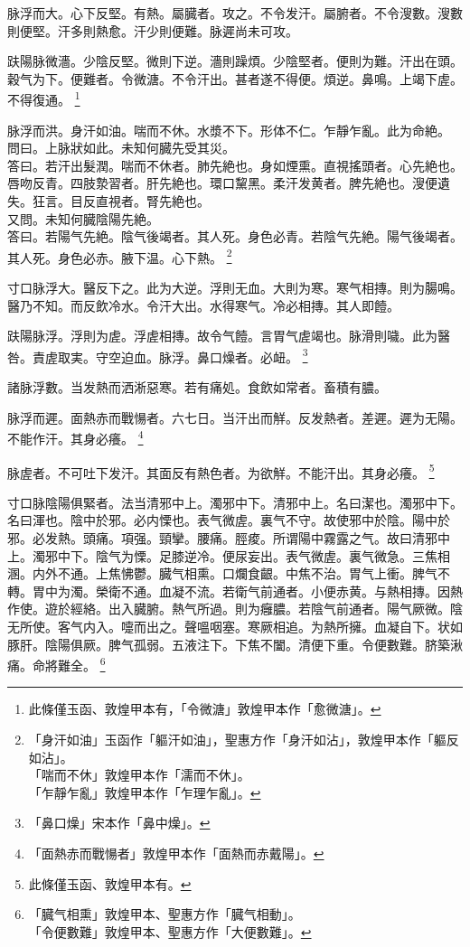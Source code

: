 \documentclass[12pt,twoside,UTF8,b5paper]{ctexbook}
\begin{document}
脉浮而大。心下反堅。有熱。屬臓者。攻之。不令发汗。屬腑者。不令溲數。溲數則便堅。汗多則熱愈。汗少則便難。脉遲尚未可攻。

趺陽脉微濇。少陰反堅。微則下逆。濇則躁煩。少陰堅者。便則为難。汗出在頭。穀气为下。便難者。令微溏。不令汗出。甚者遂不得便。煩逆。鼻鳴。上竭下虗。不得復通。
	\footnote{此條僅玉函、敦煌甲本有，「令微溏」敦煌甲本作「愈微溏」。}

脉浮而洪。身汗如油。喘而不休。水漿不下。形体不仁。乍靜乍亂。此为命絶。\\
問曰。上脉狀如此。未知何臓先受其災。\\
答曰。若汗出髮潤。喘而不休者。肺先絶也。身如煙熏。直視搖頭者。心先絶也。唇吻反青。四肢漐習者。肝先絶也。環口黧黑。柔汗发黄者。脾先絶也。溲便遺失。狂言。目反直視者。腎先絶也。\\
又問。未知何臓陰陽先絶。\\
答曰。若陽气先絶。陰气後竭者。其人死。身色必青。若陰气先絶。陽气後竭者。其人死。身色必赤。腋下温。心下熱。
	\footnote{「身汗如油」玉函作「軀汗如油」，聖惠方作「身汗如沾」，敦煌甲本作「軀反如沾」。\\「喘而不休」敦煌甲本作「濡而不休」。\\「乍靜乍亂」敦煌甲本作「乍理乍亂」。}

寸口脉浮大。醫反下之。此为大逆。浮則无血。大則为寒。寒气相摶。則为腸鳴。醫乃不知。而反飲冷水。令汗大出。水得寒气。冷必相摶。其人即饐。

趺陽脉浮。浮則为虗。浮虗相摶。故令气饐。言胃气虗竭也。脉滑則噦。此为醫咎。責虗取実。守空迫血。脉浮。鼻口燥者。必衄。
	\footnote{「鼻口燥」宋本作「鼻中燥」。}

諸脉浮數。当发熱而洒淅惡寒。若有痛処。食飲如常者。畜積有膿。

脉浮而遲。面熱赤而戰愓者。六七日。当汗出而觧。反发熱者。差遲。遲为无陽。不能作汗。其身必癢。
	\footnote{「面熱赤而戰愓者」敦煌甲本作「面熱而赤戴陽」。}

脉虗者。不可吐下发汗。其面反有熱色者。为欲觧。不能汗出。其身必癢。
	\footnote{此條僅玉函、敦煌甲本有。}

寸口脉陰陽俱緊者。法当清邪中上。濁邪中下。清邪中上。名曰潔也。濁邪中下。名曰渾也。陰中於邪。必内慄也。表气微虗。裏气不守。故使邪中於陰。陽中於邪。必发熱。頭痛。項强。頸攣。腰痛。脛痠。所谓陽中霧露之气。故曰清邪中上。濁邪中下。陰气为慄。足膝逆冷。便尿妄出。表气微虗。裏气微急。三焦相溷。内外不通。上焦怫鬱。臓气相熏。口爛食齦。中焦不治。胃气上衝。脾气不轉。胃中为濁。榮衛不通。血凝不流。若衛气前通者。小便赤黄。与熱相摶。因熱作使。遊於經絡。出入臓腑。熱气所過。則为癰膿。若陰气前通者。陽气厥微。陰无所使。客气内入。嚏而出之。聲嗢咽塞。寒厥相追。为熱所擁。血凝自下。状如豚肝。陰陽俱厥。脾气孤弱。五液注下。下焦不闔。清便下重。令便數難。脐築湫痛。命將難全。
	\footnote{「臓气相熏」敦煌甲本、聖惠方作「臓气相動」。\\「令便數難」敦煌甲本、聖惠方作「大便數難」。}
\end{document}
